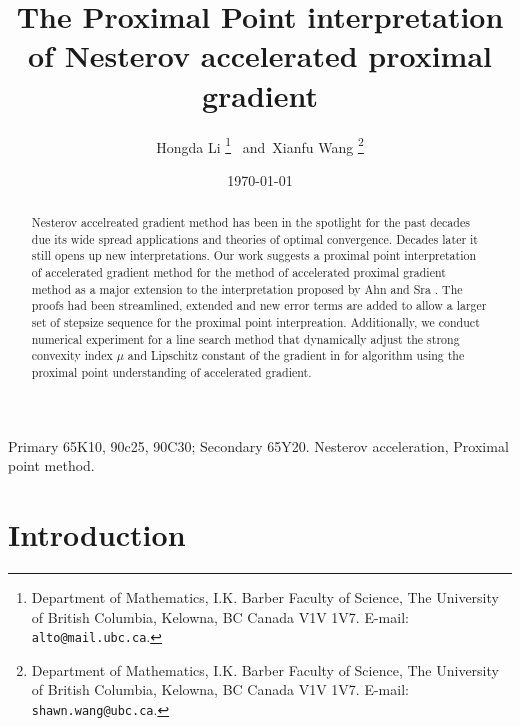 \documentclass[12pt]{article}
\begin{document}
\title{{\selectfont The Proximal Point interpretation of Nesterov accelerated proximal gradient}}

\author{
    Hongda Li
    \thanks{Department of Mathematics, I.K. Barber Faculty of Science,
    The University of British Columbia, Kelowna, BC Canada V1V 1V7. E-mail:  \texttt{alto@mail.ubc.ca}.}~ and~Xianfu Wang
    \thanks{Department of Mathematics, I.K. Barber Faculty of Science,
    The University of British Columbia, Kelowna, BC Canada V1V 1V7. E-mail:  \texttt{shawn.wang@ubc.ca}.}
}

\date{\today}

\maketitle


\begin{abstract} 
    \noindent
    Nesterov accelreated gradient method has been in the spotlight for the past decades due its wide spread applications and theories of optimal convergence. 
    Decades later it still opens up new interpretations. 
    Our work suggests a proximal point interpretation of accelerated gradient method for the method of accelerated proximal gradient method as a major extension to the interpretation proposed by Ahn and Sra \cite{ahn_understanding_2022}. 
    The proofs had been streamlined, extended and new error terms are added to allow a larger set of stepsize sequence for the proximal point interpreation. 
    Additionally, we conduct numerical experiment for a line search method that dynamically adjust the strong convexity index $\mu$ and Lipschitz constant of the gradient in for algorithm  using the proximal point understanding of accelerated gradient. 
    
\end{abstract}

Primary 65K10, 90c25, 90C30; Secondary 65Y20. 
 Nesterov acceleration, Proximal point method. 

\section{Introduction}
    
\end{document}
